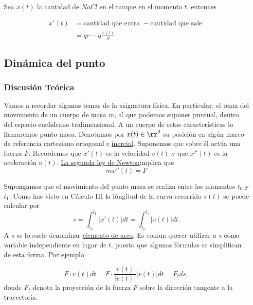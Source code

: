  Sea $x(t)$ la cantidad de $NaCl$ en el tanque en el momento $t$. entonces

\[\begin{split}
   x'(t)&=\text{cantidad que entra }-\text{cantidad que sale }\\
          &=qr-q\frac{x(t)}{N}
  \end{split}
\]




\subsection{Dinámica del punto}

\subsubsection{Discusión Teórica}
Vamos a recordar algunas temas de la asignatura física. En particular, el tema del movimiento de un cuerpo de masa $m$, al que podemos suponer puntual, dentro del espacio euclideano tridimensional. A un cuerpo de estas características lo llamaremos punto masa. Denotamos por $x(t)\in \rr^3$ su posición en algún marco de referencia cartesiano ortogonal e \href{https://es.wikipedia.org/wiki/Sistema_de_referencia_inercial}{inercial}\link. Suponemos
que sobre él actúa una fuerza $F$. Recordemos que $x'(t)$ es la velocidad $v(t)$ y que $x''(t)$ es la aceleración $a(t)$.
\href{http://es.wikipedia.org/wiki/Leyes_de_Newton\#Segunda_ley_de_Newton_o_ley_de_fuerza}{La segunda ley de Newton}\link implica que
\begin{equation}\label{2leyR}\boxed{mx''(t)=F}\end{equation}


Supongamos que el movimiento del punto masa se realiza entre los momentos $t_0$ y $t_1$. Como has visto en Cálculo III la lóngitud de la curva recorrida 
$s(t)$ se puede calcular por
\begin{equation}\label{2ley}s=\int_{t_0}^{t_1}|x'(t)|dt=\int_{t_0}^{t_1}|v(t)|dt.\end{equation}
A $s$ se lo suele denominar \href{http://es.wikipedia.org/wiki/Longitud_de_arco}{elemento de arco}\link. Es comun querer utilizar a $s$ como variable independiente en
lugar de $t$, puesto que algunas fórmulas se simplifican de esta forma. Por ejemplo

\begin{equation}\label{pre_trab} F\cdot v(t)dt=F\cdot\frac{v(t)}{|v(t)|}|v(t)|dt=F_tds,\end{equation}
donde $F_t$ denota la proyección de la fuerza $F$ sobre la dirección tangente a la trayectoria.





